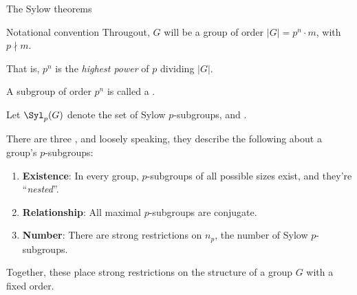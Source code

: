 \documentclass[8pt, handout]{beamer}
\newcommand{\Pause}{}      %
\begin{document}
\begin{frame}{The Sylow theorems}

  \begin{alertblock}{Notational convention}
    Througout, $G$ will be a group of order $|G|=p^n\cdot m$, with
    $p\nmid m$. \medskip\Pause

    That is, $p^n$ is the \emph{highest power} of $p$ dividing
    $|G|$. \medskip\Pause

    A subgroup of order $p^n$ is called a . \medskip\Pause
    
    Let $\Syl_p(G)$ denote the set of Sylow $p$-subgroups, and
    .
  \end{alertblock}

  \medskip\Pause

  There are three , and loosely speaking, they
  describe the following about a group's $p$-subgroups:

  \smallskip\Pause

  \begin{enumerate}
  \item \textbf{Existence}: In every group, $p$-subgroups of all
    possible sizes exist, and they're ``\emph{nested}''. \smallskip\Pause
  \item \textbf{Relationship}: All maximal $p$-subgroups are
    conjugate. \smallskip\Pause
  \item \textbf{Number}: There are strong restrictions on $n_p$, the
    number of Sylow $p$-subgroups.
  \end{enumerate}

  \medskip\Pause

  Together, these place strong restrictions on the structure of a
  group $G$ with a fixed order.  

\end{frame}

\end{document}
